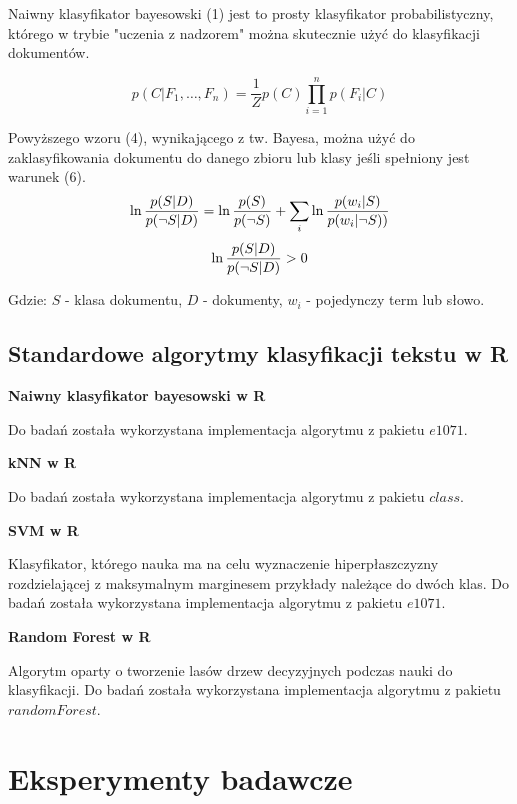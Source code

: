 \documentclass[a4paper, 10pt]{article}
\begin{document}
Naiwny klasyfikator bayesowski (1) jest to prosty klasyfikator probabilistyczny, którego w trybie "uczenia z nadzorem" można skutecznie użyć do 
klasyfikacji dokumentów.

\begin{equation}
p(C \vert F_1,\dots,F_n) = \frac{1}{Z}  p(C) \prod_{i=1}^n p(F_i \vert C)
\end{equation}

Powyższego wzoru (4), wynikającego z tw. Bayesa, można użyć do zaklasyfikowania dokumentu do danego zbioru lub klasy jeśli spełniony jest warunek (6).
\begin{equation}
\ln{p(S\vert D)\over p(\neg S\vert D)}=\ln{p(S)\over p(\neg S)}+\sum_i \ln{p(w_i\vert S)\over p(w_i\vert\neg S))}
\end{equation}
\begin{equation}
\ln{p(S\vert D)\over p(\neg S\vert D)} > 0
\end{equation}

Gdzie: $S$ - klasa dokumentu, $D$ - dokumenty, $w_i$ - pojedynczy term lub słowo.
	

	\subsection{Standardowe algorytmy klasyfikacji tekstu w R}
	
	{\bf{Naiwny klasyfikator bayesowski w R}}
	
	Do badań została wykorzystana implementacja algorytmu z pakietu $e1071$.
	
	{\bf{kNN w R}}
	
	Do badań została wykorzystana implementacja algorytmu z pakietu $class$.
	
	{\bf{SVM w R}}
	
	Klasyfikator, którego nauka ma na celu wyznaczenie hiperpłaszczyzny rozdzielającej z maksymalnym marginesem przykłady należące do dwóch klas.
	Do badań została wykorzystana implementacja algorytmu z pakietu $e1071$.
	
	{\bf{Random Forest w R}}
	
	Algorytm oparty o tworzenie lasów drzew decyzyjnych podczas nauki do klasyfikacji. Do badań została wykorzystana implementacja algorytmu z pakietu $randomForest$.
	
	

\section{Eksperymenty badawcze}
\end{document}
